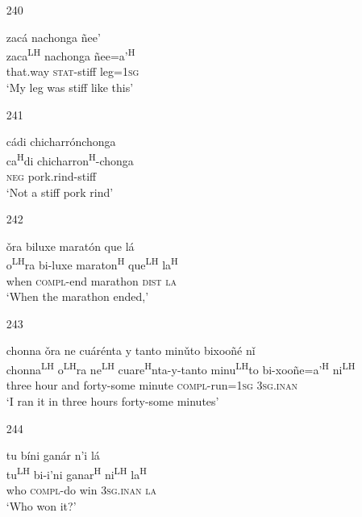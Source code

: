 \begin{itemize}
\item[240]
 
\glll  zac\'{a} nachonga \~{n}ee' \\
zaca\textsuperscript{LH} nachonga \~{n}ee=a'\textsuperscript{H} \\
that.way \textsc{stat}-stiff leg=\textsc{1sg} \\
\glt `My leg was stiff like this'
 


\item[241]
 
\glll   c\'{a}di chicharr\'{o}nchonga \\
 ca\textsuperscript{H}di chicharron\textsuperscript{H}-chonga \\
\textsc{neg} pork.rind-stiff \\
\glt `Not a stiff pork rind'
 


\item[242]
 
\glll   \v{o}ra biluxe marat\'{o}n que l\'{a} \\
 o\textsuperscript{LH}ra bi-luxe maraton\textsuperscript{H} que\textsuperscript{LH} la\textsuperscript{H} \\
 when \textsc{compl}-end marathon \textsc{dist} \textsc{la} \\
\glt `When the marathon ended,'
 


\item[243]
 
\glll   chonna \v{o}ra ne cu\'{a}r\'{e}nta y tanto min\v{u}to bixoo\~{n}\'{e} n\v{i} \\
chonna\textsuperscript{LH} o\textsuperscript{LH}ra ne\textsuperscript{LH} cuare\textsuperscript{H}nta-y-tanto minu\textsuperscript{LH}to bi-xoo\~{n}e=a'\textsuperscript{H} ni\textsuperscript{LH} \\ 
three hour and forty-some minute \textsc{compl}-run=\textsc{1sg} \textsc{3sg.inan}\\
\glt `I ran it in three hours forty-some minutes'
 


\item[244]
 
\glll   tu b\'{i}ni gan\'{a}r n'{i} l\'{a} \\
tu\textsuperscript{LH} bi-i'ni ganar\textsuperscript{H} ni\textsuperscript{LH} la\textsuperscript{H} \\
who \textsc{compl}-do win \textsc{3sg.inan} \textsc{la} \\
\glt `Who won it?'
 


\end{itemize}
